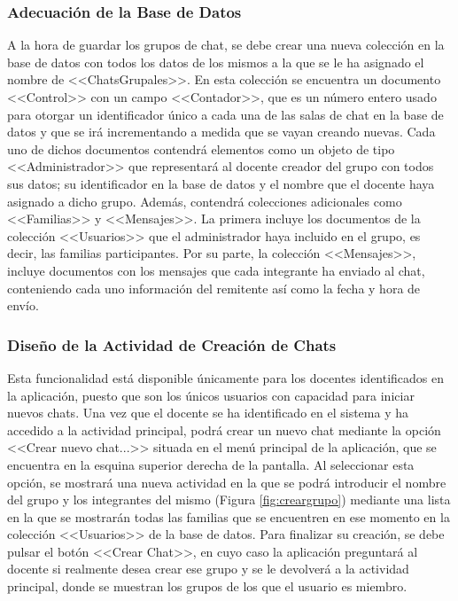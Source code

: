 \subsubsection{Adecuación de la Base de Datos}
A la hora de guardar los grupos de chat, se debe crear una nueva colección en la base de datos con todos los datos de los mismos a la que se le ha asignado el nombre de \mbox{<<ChatsGrupales>>}. En esta colección se encuentra un documento <<Control>> con un campo <<Contador>>, que es un número entero usado para otorgar un identificador único a cada una de las salas de chat en la base de datos y que se irá incrementando a medida que se vayan creando nuevas. Cada uno de dichos documentos contendrá elementos como un objeto de tipo <<Administrador>> que representará al docente creador del grupo con todos sus datos; su identificador en la base de datos y el nombre que el docente haya asignado a dicho grupo. Además, contendrá colecciones adicionales como <<Familias>> y <<Mensajes>>. La primera incluye los documentos de la colección <<Usuarios>> que el administrador haya incluido en el grupo, es decir, las familias participantes. Por su parte, la colección <<Mensajes>>, incluye documentos con los mensajes que cada integrante ha enviado al chat, conteniendo cada uno información del remitente así como la fecha y hora de envío.

\subsubsection{Diseño de la Actividad de Creación de Chats}
Esta funcionalidad está disponible únicamente para los docentes identificados en la aplicación, puesto que son los únicos usuarios con capacidad para iniciar nuevos chats. Una vez que el docente se ha identificado en el sistema y ha accedido a la actividad principal, podrá crear un nuevo chat mediante la opción <<Crear nuevo chat...>> situada en el menú principal de la aplicación, que se encuentra en la esquina superior derecha de la pantalla. Al seleccionar esta opción, se mostrará una nueva actividad en la que se podrá introducir el nombre del grupo y los integrantes del mismo (Figura \ref{fig:creargrupo}) mediante una lista en la que se mostrarán todas las familias que se encuentren en ese momento en la colección <<Usuarios>> de la base de datos. Para finalizar su creación, se debe pulsar el botón <<Crear Chat>>, en cuyo caso la aplicación preguntará al docente si realmente desea crear ese grupo y se le devolverá a la actividad principal, donde se muestran los grupos de los que el usuario es miembro.

